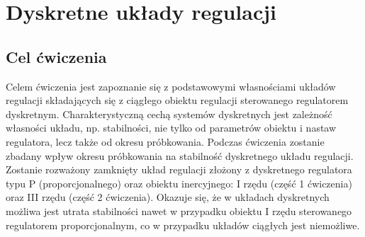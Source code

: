 \documentclass[12pt]{article}
\begin{document}
 
 

% 
% 
% 
% 
% 
% 
% 
% 

\section{Dyskretne układy regulacji}

\subsection{Cel ćwiczenia}

Celem ćwiczenia jest zapoznanie się z podstawowymi własnościami układów regulacji składających się z 
ciągłego obiektu regulacji sterowanego regulatorem dyskretnym. Charakterystyczną cechą systemów 
dyskretnych jest zależność własności układu, np. stabilności, nie tylko od
parametrów obiektu i nastaw regulatora, lecz także od okresu próbkowania. Podczas ćwiczenia zostanie zbadany wpływ okresu próbkowania 
na stabilność dyskretnego układu regulacji. Zostanie rozważony zamknięty układ regulacji złożony z 
dyskretnego regulatora typu P (proporcjonalnego) oraz obiektu inercyjnego: I rzędu (część 1 ćwiczenia) oraz 
III rzędu (część 2 ćwiczenia). Okazuje się, że w układach dyskretnych możliwa jest utrata stabilności nawet w 
przypadku obiektu I rzędu sterowanego regulatorem proporcjonalnym, co w przypadku układów ciągłych jest 
niemożliwe.
\end{document}

